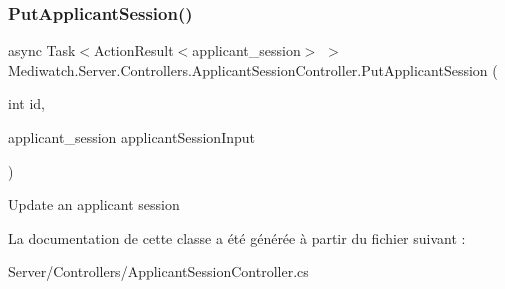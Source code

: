 \subsubsection{\texorpdfstring{Put\+Applicant\+Session()}{PutApplicantSession()}}
{\footnotesize\ttfamily async Task$<$Action\+Result$<$applicant\+\_\+session$>$ $>$ Mediwatch.\+Server.\+Controllers.\+Applicant\+Session\+Controller.\+Put\+Applicant\+Session (\begin{DoxyParamCaption}\item[{int}]{id,  }\item[{applicant\+\_\+session}]{applicant\+Session\+Input }\end{DoxyParamCaption})\hspace{0.3cm}{\ttfamily [inline]}}

Update an applicant session 

La documentation de cette classe a été générée à partir du fichier suivant \+:\begin{DoxyCompactItemize}
\item 
Server/\+Controllers/Applicant\+Session\+Controller.\+cs\end{DoxyCompactItemize}
